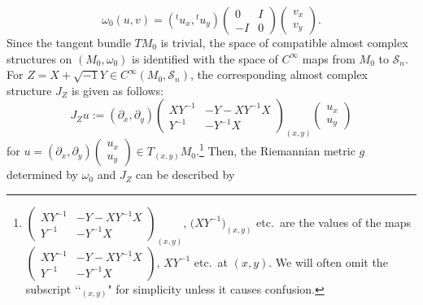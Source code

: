 \documentclass[pdftex]{sigma}
\numberwithin{equation}{section}
\begin{document}
\begin{equation*}\label{omega}
\omega_0(u,v)=\left({}^tu_x, {}^tu_y\right)
\begin{pmatrix}
0 & I \\
-I & 0
\end{pmatrix}
\begin{pmatrix}
v_x\\
v_y
\end{pmatrix}.
\end{equation*}
Since the tangent bundle $TM_0$ is trivial, the space of compatible almost complex structures on $(M_0,\omega_0)$ is identified with the space of $C^\infty$ maps from $M_0$ to ${\mathcal S}_n$. For $Z=X+\sqrt{-1}Y\in C^\infty ( M_0,{\mathcal S}_n)$, the corresponding almost complex structure $J_Z$ is given as follows:
\begin{equation}\label{J}
J_Zu:=(\partial_x, \partial_y)
\begin{pmatrix}
XY^{-1} & -Y-XY^{-1}X \\
Y^{-1} & -Y^{-1}X
\end{pmatrix}_{(x,y)}
\begin{pmatrix}
u_x \\
u_y
\end{pmatrix}
\end{equation}
for $u=(\partial_x, \partial_y)
\left(\begin{smallmatrix}
u_x \\
u_y
\end{smallmatrix}\right)\in T_{(x,y)}M_0$.\footnote{
$\left(\begin{smallmatrix}
XY^{-1} & -Y-XY^{-1}X \\
Y^{-1} & -Y^{-1}X
\end{smallmatrix}\right)_{(x,y)}$, $\bigl(XY^{-1}\bigr)_{(x,y)}$ etc.\
are the values of the maps
$\left(\begin{smallmatrix}
XY^{-1} & -Y-XY^{-1}X \\
Y^{-1} & -Y^{-1}X
\end{smallmatrix}\right)$, $XY^{-1}$ etc.\
at $(x,y)$. We will often omit the subscript \lq\lq${}_{(x,y)}$" for simplicity unless it causes confusion.} Then, the Riemannian metric $g$ determined by $\omega_0$ and $J_Z$ can be described by
\end{document}
